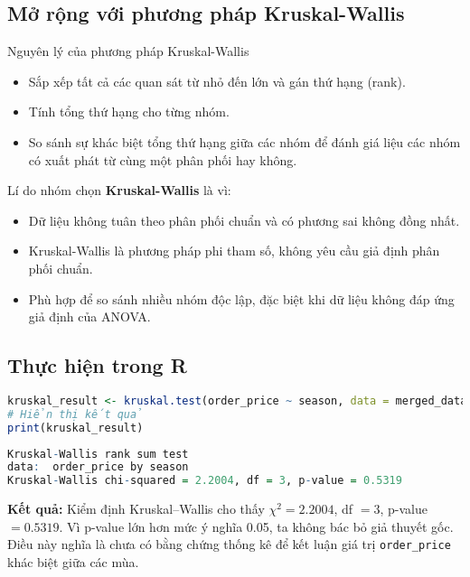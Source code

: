 \subsection{Mở rộng với phương pháp Kruskal-Wallis}
\begin{boxH}
    Nguyên lý của phương pháp Kruskal-Wallis
\begin{itemize}
    \item Sắp xếp tất cả các quan sát từ nhỏ đến lớn và gán thứ hạng (rank).
    \item Tính tổng thứ hạng cho từng nhóm.
    \item So sánh sự khác biệt tổng thứ hạng giữa các nhóm để đánh giá liệu các nhóm có xuất phát từ cùng một phân phối hay không.
\end{itemize}
\end{boxH}

Lí do nhóm chọn \textbf{Kruskal-Wallis} là vì:
\begin{itemize}
    \item Dữ liệu không tuân theo phân phối chuẩn và có phương sai không đồng nhất.
    \item Kruskal-Wallis là phương pháp phi tham số, không yêu cầu giả định phân phối chuẩn.
    \item Phù hợp để so sánh nhiều nhóm độc lập, đặc biệt khi dữ liệu không đáp ứng giả định của ANOVA.
\end{itemize}
\subsection{Thực hiện trong R}
\begin{lstlisting}[language=R, caption={Phép kiểm Kruskal–Wallis trong R}]
kruskal_result <- kruskal.test(order_price ~ season, data = merged_data)
# Hiển thị kết quả
print(kruskal_result)
\end{lstlisting}

\begin{lstlisting}[language=R, caption={Kết quả kiểm định Kruskal-Wallis trong R}]
	Kruskal-Wallis rank sum test
data:  order_price by season
Kruskal-Wallis chi-squared = 2.2004, df = 3, p-value = 0.5319
\end{lstlisting}

\textbf{Kết quả:} Kiểm định Kruskal–Wallis cho thấy $\chi^2 = 2.2004$, df $= 3$, p-value $= 0.5319$. 
Vì p-value lớn hơn mức ý nghĩa 0.05, ta không bác bỏ giả thuyết gốc. 
Điều này nghĩa là chưa có bằng chứng thống kê để kết luận giá trị \texttt{order\_price} khác biệt giữa các mùa.


